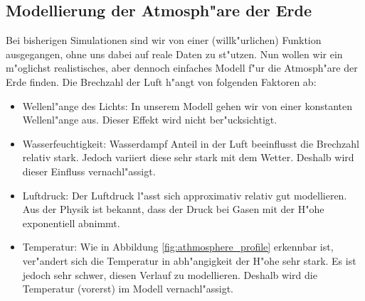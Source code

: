 \begin{refsection}
\section{Modellierung der Atmosph"are der Erde}

Bei bisherigen Simulationen sind wir von einer (willk"urlichen) Funktion ausgegangen, ohne uns dabei auf reale Daten zu st"utzen. 
Nun wollen wir ein m"oglichst realistisches, aber dennoch einfaches Modell f"ur die Atmosph"are der Erde finden.
Die Brechzahl der Luft h"angt von folgenden Faktoren ab:
\begin{itemize}
  \item Wellenl"ange des Lichts: In unserem Modell gehen wir von einer konstanten Wellenl"ange aus. Dieser Effekt wird nicht ber"ucksichtigt.
  \item Wasserfeuchtigkeit: Wasserdampf Anteil in der Luft beeinflusst die Brechzahl relativ stark. Jedoch variiert diese sehr stark mit dem Wetter. Deshalb wird dieser Einfluss vernachl"assigt. 
  \item Luftdruck: Der Luftdruck l"asst sich approximativ relativ gut modellieren. Aus der Physik ist bekannt, dass der Druck bei Gasen mit der H"ohe exponentiell abnimmt. 
  \item Temperatur: Wie in Abbildung \ref{fig:athmosphere_profile} erkennbar ist, ver"andert sich die Temperatur in abh"angigkeit der H"ohe sehr stark. Es ist jedoch sehr schwer, diesen Verlauf zu modellieren. Deshalb wird die Temperatur (vorerst) im Modell vernachl"assigt.
\end{itemize}


\end{refsection}
